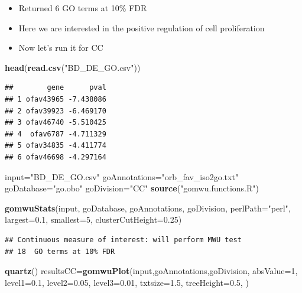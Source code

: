 \documentclass[
]{article}
\newenvironment{Shaded}{\begin{snugshade}}{\end{snugshade}}
\newcommand{\DataTypeTok}[1]{\textcolor[rgb]{0.13,0.29,0.53}{#1}}
\newcommand{\DecValTok}[1]{\textcolor[rgb]{0.00,0.00,0.81}{#1}}
\newcommand{\FloatTok}[1]{\textcolor[rgb]{0.00,0.00,0.81}{#1}}
\newcommand{\KeywordTok}[1]{\textcolor[rgb]{0.13,0.29,0.53}{\textbf{#1}}}
\newcommand{\NormalTok}[1]{#1}
\newcommand{\StringTok}[1]{\textcolor[rgb]{0.31,0.60,0.02}{#1}}
\begin{document}
\begin{itemize}
\item
  Returned 6 GO terms at 10\% FDR
\item
  Here we are interested in the positive regulation of cell
  proliferation
\item
  Now let's run it for CC
\end{itemize}

\begin{Shaded}
\begin{Highlighting}[]
\KeywordTok{head}\NormalTok{(}\KeywordTok{read.csv}\NormalTok{(}\StringTok{"BD_DE_GO.csv"}\NormalTok{))}
\end{Highlighting}
\end{Shaded}

\begin{verbatim}
##        gene      pval
## 1 ofav43965 -7.438086
## 2 ofav39923 -6.469170
## 3 ofav46740 -5.510425
## 4  ofav6787 -4.711329
## 5 ofav34835 -4.411774
## 6 ofav46698 -4.297164
\end{verbatim}

\begin{Shaded}
\begin{Highlighting}[]
\NormalTok{input=}\StringTok{"BD_DE_GO.csv"}
\NormalTok{goAnnotations=}\StringTok{"orb_fav_iso2go.txt"}
\NormalTok{goDatabase=}\StringTok{"go.obo"}
\NormalTok{goDivision=}\StringTok{"CC"}
\KeywordTok{source}\NormalTok{(}\StringTok{"gomwu.functions.R"}\NormalTok{)}

\KeywordTok{gomwuStats}\NormalTok{(input, goDatabase, goAnnotations, goDivision,}
           \DataTypeTok{perlPath=}\StringTok{"perl"}\NormalTok{,}
           \DataTypeTok{largest=}\FloatTok{0.1}\NormalTok{,}
           \DataTypeTok{smallest=}\DecValTok{5}\NormalTok{,}
           \DataTypeTok{clusterCutHeight=}\FloatTok{0.25}\NormalTok{)}
\end{Highlighting}
\end{Shaded}

\begin{verbatim}
## Continuous measure of interest: will perform MWU test
## 18  GO terms at 10% FDR
\end{verbatim}

\begin{Shaded}
\begin{Highlighting}[]
\KeywordTok{quartz}\NormalTok{()}
\NormalTok{resultsCC=}\KeywordTok{gomwuPlot}\NormalTok{(input,goAnnotations,goDivision,}
                  \DataTypeTok{absValue=}\DecValTok{1}\NormalTok{,}
                  \DataTypeTok{level1=}\FloatTok{0.1}\NormalTok{,}
                  \DataTypeTok{level2=}\FloatTok{0.05}\NormalTok{,}
                  \DataTypeTok{level3=}\FloatTok{0.01}\NormalTok{,}
                  \DataTypeTok{txtsize=}\FloatTok{1.5}\NormalTok{,}
                  \DataTypeTok{treeHeight=}\FloatTok{0.5}\NormalTok{,}
\NormalTok{)}
\end{Highlighting}
\end{Shaded}
\end{document}
